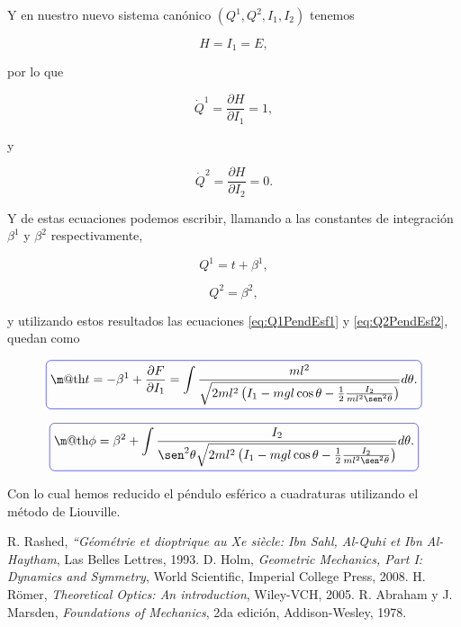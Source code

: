 \documentclass[a4paper,10pt]{article}
\makeatletter
\numberwithin{equation}{section}
\newcommand*{\boxcolor}{blue}
\renewcommand{\boxed}[1]{\textcolor{\boxcolor}{%
\tikz[baseline={([yshift=-1ex]current bounding box.center)}] \node [rectangle, minimum width=1ex,rounded corners,draw] {\normalcolor\m@th$\displaystyle#1$};}}
\makeatother
\begin{document}
Y en nuestro nuevo sistema canónico $(Q^1,Q^2,I_1,I_2)$ tenemos 

\begin{equation}
 H = I_1 = E,
\end{equation}

por lo que 

\begin{equation}
 \dot{Q}^1 = \frac{\partial H}{\partial I_1} = 1,
\end{equation}

y 

\begin{equation}
 \dot{Q}^2 = \frac{\partial H}{\partial I_2} = 0.
\end{equation}

Y de estas ecuaciones podemos escribir, llamando a las constantes de integración 
$\beta^1$ y $\beta^2$ respectivamente, 

\begin{equation}
 Q^1 = t + \beta^1,
\end{equation}

\begin{equation}
 Q^2 = \beta^2,
\end{equation}

y utilizando estos resultados las ecuaciones \eqref{eq:Q1PendEsf1} y \eqref{eq:Q2PendEsf2}, 
quedan como 

\begin{equation}
 \boxed{t = -\beta^1 + \frac{\partial F}{\partial I_1} = \int \frac{ml^2}{\sqrt{2ml^2\left(I_1 -
 mgl\cos{\theta} - \frac{1}{2}\frac{I_2}{ml^2\sen^2{\theta}} \right)}}d\theta.}
\end{equation}

\begin{equation}
 \boxed{\phi = \beta^2 + \int \frac{I_2}{\sen^2{\theta}\sqrt{2ml^2\left(I_1 - mgl\cos{\theta} - 
 \frac{1}{2}\frac{I_2}{ml^2\sen^2{\theta}} \right)}}d\theta.}
\end{equation}

Con lo cual hemos reducido el péndulo esférico a cuadraturas utilizando el método 
de Liouville.

\begin{thebibliography}{10}
R. Rashed, \emph{“Géométrie et dioptrique au Xe siècle: Ibn Sahl, 
Al-Quhi et Ibn Al-Haytham}, Las Belles Lettres, 1993.
D. Holm, \emph{Geometric Mechanics, Part I: Dynamics and Symmetry}, World Scientific, 
Imperial College Press, 2008.
H. Römer, \emph{Theoretical Optics: An introduction}, Wiley-VCH, 2005.
 R. Abraham y J. Marsden, \emph{Foundations of Mechanics}, 2da edición, Addison-Wesley,
 1978.
\end{thebibliography}
\end{document}
